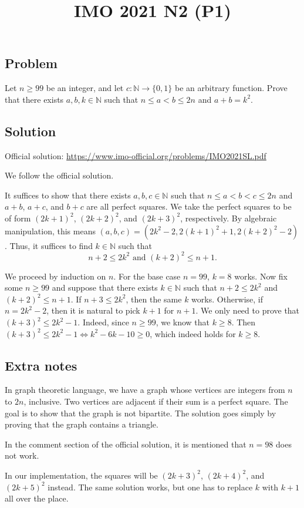 \documentclass{article}
\title{IMO 2021 N2 (P1)}
\author{}
\date{}
\newcommand{\N}{\mathbb{N}}
\begin{document}
\maketitle



\subsection*{Problem}

Let $n \geq 99$ be an integer, and let $c : \N \to \{0, 1\}$ be an arbitrary function.
Prove that there exists $a, b, k \in \N$ such that $n \leq a < b \leq 2n$ and $a + b = k^2$.



\subsection*{Solution}

Official solution: \url{https://www.imo-official.org/problems/IMO2021SL.pdf}

We follow the official solution.

It suffices to show that there exists $a, b, c \in \N$ such that $n \leq a < b < c \leq 2n$ and $a + b$, $a + c$, and $b + c$ are all perfect squares.
We take the perfect squares to be of form $(2k + 1)^2$, $(2k + 2)^2$, and $(2k + 3)^2$, respectively.
By algebraic manipulation, this means $(a, b, c) = (2k^2 - 2, 2(k + 1)^2 + 1, 2(k + 2)^2 - 2)$.
Thus, it suffices to find $k \in \N$ such that
\[ n + 2 \leq 2k^2 \text{ and } (k + 2)^2 \leq n + 1. \]

We proceed by induction on $n$.
For the base case $n = 99$, $k = 8$ works.
Now fix some $n \geq 99$ and suppose that there exists $k \in \N$ such that $n + 2 \leq 2k^2$ and $(k + 2)^2 \leq n + 1$.
If $n + 3 \leq 2k^2$, then the same $k$ works.
Otherwise, if $n = 2k^2 - 2$, then it is natural to pick $k + 1$ for $n + 1$.
We only need to prove that $(k + 3)^2 \leq 2k^2 - 1$.
Indeed, since $n \geq 99$, we know that $k \geq 8$.
Then $(k + 3)^2 \leq 2k^2 - 1 \iff k^2 - 6k - 10 \geq 0$, which indeed holds for $k \geq 8$.



\subsection*{Extra notes}

In graph theoretic language, we have a graph whose vertices are integers from $n$ to $2n$, inclusive.
Two vertices are adjacent if their sum is a perfect square.
The goal is to show that the graph is not bipartite.
The solution goes simply by proving that the graph contains a triangle.

In the comment section of the official solution, it is mentioned that $n = 98$ does not work.

In our implementation, the squares will be $(2k + 3)^2$, $(2k + 4)^2$, and $(2k + 5)^2$ instead.
The same solution works, but one has to replace $k$ with $k + 1$ all over the place.
\end{document}
